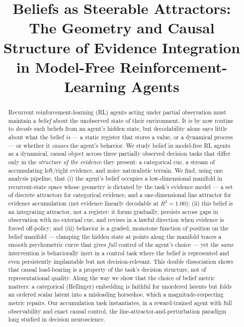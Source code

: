 \documentclass[11pt]{article}
\title{\textbf{Beliefs as Steerable Attractors:}\\[2pt]
\large The Geometry and Causal Structure of Evidence Integration\\
in Model-Free Reinforcement-Learning Agents}
\author{}
\date{}
\begin{document}
\maketitle
\vspace{-2.2em}

\begin{abstract}\noindent
Recurrent reinforcement-learning (RL) agents acting under partial observation
must maintain a \emph{belief} about the unobserved state of their environment.
It is by now routine to \emph{decode} such beliefs from an agent's hidden state,
but decodability alone says little about what the belief \emph{is} --- a static
register that stores a value, or a dynamical process --- or whether it
\emph{causes} the agent's behavior. We study belief in model-free RL agents as a
dynamical, causal object across three partially observed decision tasks that
differ only in the \emph{structure of the evidence} they present: a categorical
cue, a stream of accumulating left/right evidence, and noisy naturalistic
terrain. We find, using one analysis pipeline, that (i) the agent's belief
occupies a low-dimensional manifold in recurrent-state space whose geometry is
dictated by the task's evidence model --- a set of discrete attractors for
categorical evidence, and a one-dimensional line attractor for evidence
accumulation (net evidence linearly decodable at $R^2=1.00$); (ii) this belief
is an integrating attractor, not a register: it forms gradually, persists across
gaps in observation with no external cue, and revises in a lawful direction when
evidence is forced off-policy; and (iii) behavior is a graded, monotone function
of position on the belief manifold --- clamping the hidden state at points along
the manifold traces a smooth psychometric curve that gives \emph{full} control of
the agent's choice --- yet the \emph{same} intervention is behaviorally inert in a
control task where the belief is represented and even persistently implantable
but not decision-relevant. This double dissociation shows that causal
load-bearing is a property of the task's decision structure, not of
representational quality. Along the way we show that the choice of belief metric
matters: a categorical (Hellinger) embedding is faithful for unordered latents
but folds an ordered scalar latent into a misleading horseshoe, which a
magnitude-respecting metric repairs. Our accumulation task instantiates, in a
reward-trained agent with full observability and exact causal control, the
line-attractor-and-perturbation paradigm long studied in decision neuroscience.
\end{abstract}
\end{document}
